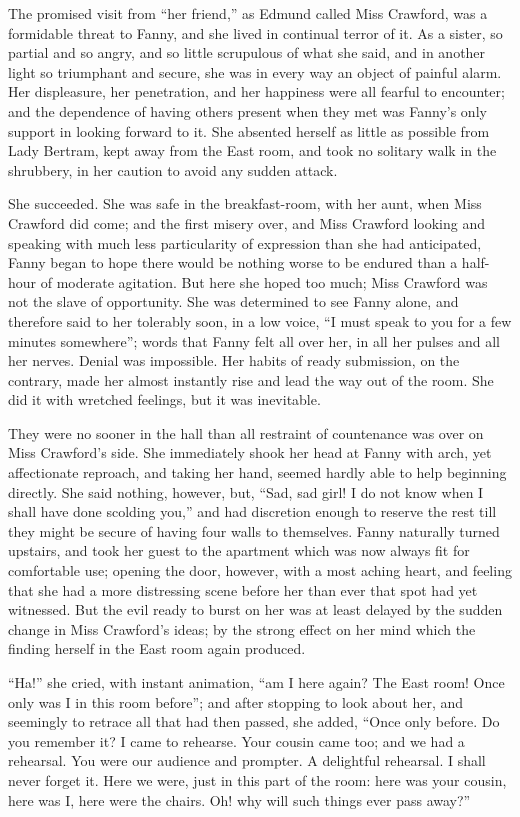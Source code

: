 The promised visit from ``her friend,'' as Edmund called
Miss Crawford, was a formidable threat to Fanny,
and she lived in continual terror of it.  As a sister,
so partial and so angry, and so little scrupulous of what
she said, and in another light so triumphant and secure,
she was in every way an object of painful alarm.
Her displeasure, her penetration, and her happiness were
all fearful to encounter; and the dependence of having
others present when they met was Fanny's only support
in looking forward to it.  She absented herself as little
as possible from Lady Bertram, kept away from the East room,
and took no solitary walk in the shrubbery, in her caution
to avoid any sudden attack.

She succeeded.  She was safe in the breakfast-room, with her aunt,
when Miss Crawford did come; and the first misery over,
and Miss Crawford looking and speaking with much less
particularity of expression than she had anticipated,
Fanny began to hope there would be nothing worse
to be endured than a half-hour of moderate agitation.
But here she hoped too much; Miss Crawford was not the slave
of opportunity.  She was determined to see Fanny alone,
and therefore said to her tolerably soon, in a low voice,
``I must speak to you for a few minutes somewhere'';
words that Fanny felt all over her, in all her pulses
and all her nerves.  Denial was impossible.  Her habits
of ready submission, on the contrary, made her almost
instantly rise and lead the way out of the room.
She did it with wretched feelings, but it was inevitable.

They were no sooner in the hall than all restraint
of countenance was over on Miss Crawford's side.
She immediately shook her head at Fanny with arch,
yet affectionate reproach, and taking her hand,
seemed hardly able to help beginning directly.
She said nothing, however, but, ``Sad, sad girl!
I do not know when I shall have done scolding you,''
and had discretion enough to reserve the rest till they
might be secure of having four walls to themselves.
Fanny naturally turned upstairs, and took her guest to the
apartment which was now always fit for comfortable use;
opening the door, however, with a most aching heart,
and feeling that she had a more distressing scene before
her than ever that spot had yet witnessed.  But the evil
ready to burst on her was at least delayed by the sudden
change in Miss Crawford's ideas; by the strong effect
on her mind which the finding herself in the East room
again produced.

``Ha!'' she cried, with instant animation, ``am I here again?
The East room!  Once only was I in this room before'';
and after stopping to look about her, and seemingly
to retrace all that had then passed, she added, ``Once
only before.  Do you remember it?  I came to rehearse.
Your cousin came too; and we had a rehearsal.  You were
our audience and prompter.  A delightful rehearsal.
I shall never forget it.  Here we were, just in this
part of the room:  here was your cousin, here was I,
here were the chairs.  Oh! why will such things ever
pass away?''

